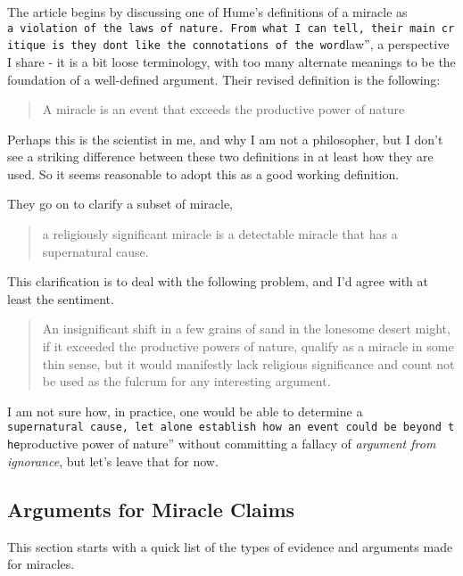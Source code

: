 \documentclass{tufte-book}
\begin{document}
The article begins by discussing one of Hume's definitions of a miracle
as
\texttt{a\ violation\ of\ the\ laws\ of\ nature\textquotesingle{}\textquotesingle{}.\ From\ what\ I\ can\ tell,\ their\ main\ critique\ is\ they\ don\textquotesingle{}t\ like\ the\ connotations\ of\ the\ word}law'',
a perspective I share - it is a bit loose terminology, with too many
alternate meanings to be the foundation of a well-defined argument.
Their revised definition is the following:

\begin{quote}
A miracle is an event that exceeds the productive power of nature
\end{quote}

Perhaps this is the scientist in me, and why I am not a philosopher, but
I don't see a striking difference between these two definitions in at
least how they are used. So it seems reasonable to adopt this as a good
working definition.

They go on to clarify a subset of miracle,

\begin{quote}
a religiously significant miracle is a detectable miracle that has a
supernatural cause.
\end{quote}

This clarification is to deal with the following problem, and I'd agree
with at least the sentiment.

\begin{quote}
An insignificant shift in a few grains of sand in the lonesome desert
might, if it exceeded the productive powers of nature, qualify as a
miracle in some thin sense, but it would manifestly lack religious
significance and count not be used as the fulcrum for any interesting
argument.
\end{quote}

I am not sure how, in practice, one would be able to determine a
\texttt{supernatural\ cause\textquotesingle{}\textquotesingle{},\ let\ alone\ establish\ how\ an\ event\ could\ be\ beyond\ the}productive
power of nature'' without committing a fallacy of
\emph{argument from ignorance}, but let's leave that for now.

\subsection{Arguments for Miracle
Claims}\label{arguments-for-miracle-claims}

This section starts with a quick list of the types of evidence and
arguments made for miracles.
\end{document}
